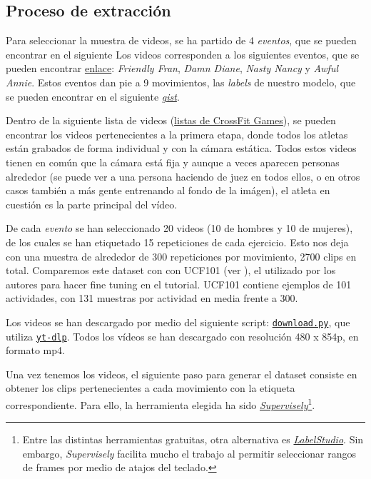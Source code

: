 \subsection{Proceso de extracción}

Para seleccionar la muestra de videos, se ha partido de 4 \textit{eventos}, que se pueden encontrar en el siguiente Los videos corresponden a los siguientes eventos, que se pueden encontrar \href{https://games.crossfit.com/workouts/games/2020}{enlace}: \textit{Friendly Fran}, \textit{Damn Diane}, \textit{Nasty Nancy} y \textit{Awful Annie}. Estos eventos dan pie a 9 movimientos, las \textit{labels} de nuestro modelo, que se pueden encontrar en el siguiente \href{https://gist.github.com/plaguss/58091caefee6acb39ae51cbc241b3cf9/raw/labels.txt}{\textit{gist}}.

Dentro de la siguiente lista de videos (\href{https://www.youtube.com/c/CrossFitGamesTV/playlists}{listas de CrossFit Games}), se pueden encontrar los videos pertenecientes a la primera etapa, donde todos los atletas están grabados de forma individual y con la cámara estática. Todos estos videos tienen en común que la cámara está fija y aunque a veces aparecen personas alrededor (se puede ver a una persona haciendo de juez en todos ellos, o en otros casos también a más gente entrenando al fondo de la imágen), el atleta en cuestión es la parte principal del vídeo.

De cada \textit{evento} se han seleccionado 20 videos (10 de hombres y 10 de mujeres), de los cuales se han etiquetado 15 repeticiones de cada ejercicio. Esto nos deja con una muestra de alrededor de 300 repeticiones por movimiento, 2700 clips en total. Comparemos este dataset con con UCF101 (ver \cite{UCF101}), el utilizado por los autores para hacer fine tuning en el tutorial. UCF101 contiene ejemplos de 101 actividades, con 131 muestras por actividad en media frente a 300.

Los videos se han descargado por medio del siguiente script: \href{https://github.com/plaguss/tfm-misc/blob/main/scripts/download.py}{\texttt{download.py}}, que utiliza \href{https://github.com/yt-dlp/yt-dlp}{\texttt{yt-dlp}}. Todos los vídeos se han descargado con resolución 480 x 854p, en formato mp4.

Una vez tenemos los videos, el siguiente paso para generar el dataset consiste en obtener los clips pertenecientes a cada movimiento con la etiqueta correspondiente. Para ello, la herramienta elegida ha sido \href{https://supervise.ly/}{\textit{Supervisely}}\footnote{Entre las distintas herramientas gratuitas, otra alternativa es \href{https://labelstud.io/}{\textit{LabelStudio}}. Sin embargo, \textit{Supervisely} facilita mucho el trabajo al permitir seleccionar rangos de frames por medio de atajos del teclado.}.

